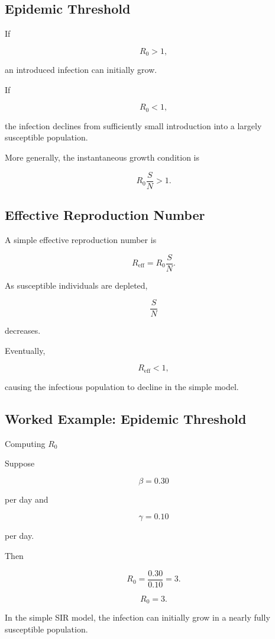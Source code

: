 \subsection{Epidemic Threshold}
\label{subsec:epidemic-threshold}

If

\[
\boxed{
R_0>1,
}
\]

an introduced infection can initially grow.

If

\[
\boxed{
R_0<1,
}
\]

the infection declines from sufficiently small introduction into a largely
susceptible population.

More generally, the instantaneous growth condition is

\[
\boxed{
R_0\frac{S}{N}>1.
}
\]

\subsection{Effective Reproduction Number}
\label{subsec:effective-reproduction-number}

A simple effective reproduction number is

\[
\boxed{
R_{\mathrm{eff}}
=
R_0
\frac{S}{N}.
}
\]

As susceptible individuals are depleted,

\[
\frac{S}{N}
\]

decreases.

Eventually,

\[
R_{\mathrm{eff}}<1,
\]

causing the infectious population to decline in the simple model.

\subsection{Worked Example: Epidemic Threshold}
\label{subsec:worked-epidemic-threshold}

\begin{workedexamplebox}{Computing \(R_0\)}

Suppose

\[
\beta=0.30
\]

per day and

\[
\gamma=0.10
\]

per day.

Then

\[
R_0
=
\frac{0.30}{0.10}
=
3.
\]

\begin{answerbox}
\[
\boxed{
R_0=3.
}
\]
\end{answerbox}

In the simple SIR model, the infection can initially grow in a nearly fully
susceptible population.

\end{workedexamplebox}


